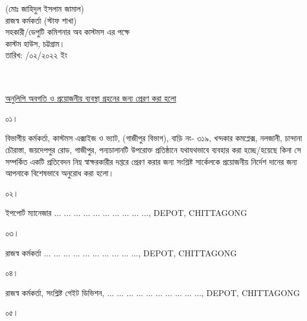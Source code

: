 \documentclass[12pt]{article}
\newcommand{\fileno}{\jsmlf}
\newcommand{\depo}{... ... ... ... ... ... ... ... ... ..., DEPOT, CHITTAGONG}
\newcommand{\rodt}{তারিখ: \hspace{2.0em}/০২/২০২২ ইং}
\begin{document}
\begin{minipage}[t]{0.40\linewidth}
\begin{center}
\footnotesize{(মোঃ জাহিদুল ইসলাম জামাল)}
\\
\footnotesize{রাজস্ব কর্মকর্তা (স্টাফ শাখা)}
\\
\scriptsize{সহকারী/ডেপুটি কমিশনার অব কাস্টমস এর পক্ষে}
\\
\scriptsize{কাস্টম হাউস, চট্টগ্রাম।}
\\
\scriptsize{{\rodt}}
\end{center}
\end{minipage}
\\
\scriptsize{{\fileno}}
\\
\underline{\scriptsize{অনুলিপি অবগতি ও প্রয়োজনীয় ব্যবস্থা গ্রহনের জন্য প্রেরণ করা হলো}}
\\
\begin{minipage}[t]{0.06\linewidth}
\scriptsize{০১।}
\end{minipage}
\begin{minipage}[t]{0.94\linewidth}
\scriptsize{বিভাগীয় কর্মকর্তা, কাস্টমস এক্সাইজ ও ভ্যাট, (গাজীপুর বিভাগ),
বাড়ি নং- ৩১৯,
খন্দকার কমপ্লেক্স, নলজানী,
চান্দানা চৌরাস্তা, জয়দেপপুর রোড,
গাজীপুর,
পন্যচালানটি উপরোক্ত প্রতিষ্ঠানে যথাযথভাবে
ব্যবহার করা হচ্ছে/হয়েছে কিনা সে
সম্পর্কিত একটি প্রতিবেদন নিম্ন স্বাক্ষরকারীর
দপ্তরে প্রেরণ করার জন্য সংশ্লিষ্ট সার্কেলকে
প্রয়োজনীয় নির্দেশ দানের জন্য আপনাকে
বিশেষভাবে অনুরোধ করা হলো।}
\end{minipage}
\begin{minipage}[t]{0.06\linewidth}
\scriptsize{০২।}
\end{minipage}
\begin{minipage}[t]{0.94\linewidth}
\scriptsize{ইপপোর্ট ম্যানেজার {\depo}}
\end{minipage}
\begin{minipage}[t]{0.06\linewidth}
\scriptsize{০৩।}
\end{minipage}
\begin{minipage}[t]{0.94\linewidth}
\scriptsize{রাজস্ব কর্মকর্তা {\depo}}
\end{minipage}
\begin{minipage}[t]{0.06\linewidth}
\scriptsize{০৪।}
\end{minipage}
\begin{minipage}[t]{0.94\linewidth}
\scriptsize{রাজস্ব কর্মকর্তা, সংশ্লিষ্ট গেইট ডিভিশন, {\depo}}
\end{minipage}
\begin{minipage}[t]{0.06\linewidth}
\scriptsize{০৫।}
\end{minipage}
\end{document}
